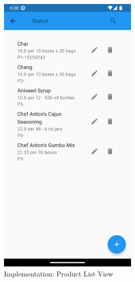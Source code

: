\documentclass[../thesis.tex]{subfiles}
\begin{document}
\begin{figure}[H]
    \centering
    \includegraphics[width=0.60\textwidth]{images/ProductScreen_List.png}
    \caption{Implementation: Product List View}
    \label{fig:ProductScreen_List}
\end{figure}
\end{document}
